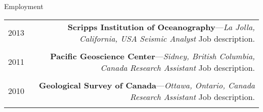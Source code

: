 \begin{rSection}{Employment}
%		
%			 
%		
%		
%		


	\begin{tabular}{L!{\VRule}R}
		
		2013 & \textbf{Scripps Institution of Oceanography}---\textit{La Jolla, California, USA}  \newline
			\textit{Seismic Analyst} \newline
			Job description. \\ \\
		
		2011 & \textbf{Pacific Geoscience Center}---\textit{Sidney, British Columbia, Canada}  \newline
			\textit{Research Assistant} \newline
			Job description. \\ \\
		
		2010 & \textbf{Geological Survey of Canada}---\textit{Ottawa, Ontario, Canada}  \newline
			\textit{Research Assistant} \newline
			Job description. \\ \\
		
	\end{tabular}
\end{rSection}